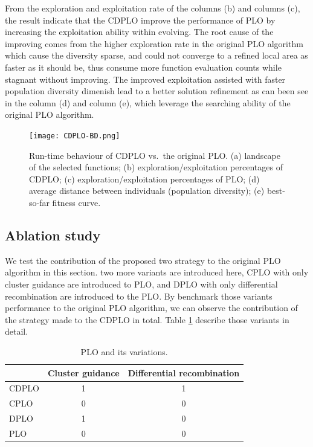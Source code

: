 \documentclass[review]{elsarticle}
\begin{document}
From the exploration and exploitation rate of the columns (b) and columns (c), the result indicate that the CDPLO improve the performance of PLO by increasing the exploitation ability within evolving. The root cause of the improving comes from the higher exploration rate in the original PLO algorithm which cause the diversity sparse, and could not converge to a refined local area as faster as it should be, thus consume more function evaluation counts while stagnant without improving. The improved exploitation assisted with faster population diversity dimenish lead to a better solution refinement as can been see in the column (d) and column (e), which leverage the searching ability of the original PLO algorithm.

\begin{figure}[htbp]
  \centering
  \texttt{[image: CDPLO-BD.png]}
  \caption{Run-time behaviour of CDPLO
           vs.\ the original PLO.
           (a) landscape of the selected functions;
           (b) exploration/exploitation percentages of CDPLO;
           (c) exploration/exploitation percentages of PLO;
           (d) average distance between individuals (population diversity);
           (e) best-so-far fitness curve.}
  \label{fig: CDPLO-BD}
\end{figure}

\subsection{Ablation study}
We test the contribution of the proposed two strategy to the original PLO algorithm in this section. two more variants are introduced here, CPLO with only cluster guidance are introduced to PLO, and DPLO with only differential recombination are introduced to the PLO. By benchmark those variants performance to the original PLO algorithm, we can observe the contribution of the strategy made to the CDPLO in total. Table \ref{table: PLO variants} describe those variants in detail.

\begin{table}[]
\centering
\caption{PLO and its variations.}
\label{table: PLO variants}
\begin{tabular}{@{}lcc@{}}
\toprule
      & Cluster guidance & Differential recombination \\ \midrule
CDPLO & 1                & 1                          \\
CPLO  & 0                & 0                          \\
DPLO  & 1                & 0                          \\
PLO   & 0                & 0                          \\ \bottomrule
\end{tabular}
\end{table}
\end{document}
